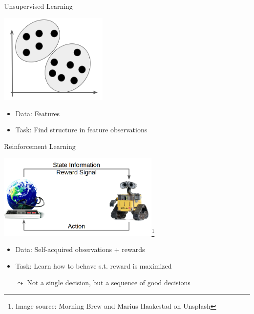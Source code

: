 \begin{frame}[c]{Unsupervised Learning}
	
	\centering
	\includegraphics[width=0.4\textwidth]{images/clustering.png}
	
	\bigskip
	
	\begin{itemize}
		\item Data: Features 
		\item Task: Find structure in feature observations
	\end{itemize}	
	
	
\end{frame}
\begin{frame}[c]{Reinforcement Learning}
	
		\centering
	\includegraphics[width=0.6\textwidth]{images/rl_comic.png}\footnote{Image source: Morning Brew and Marius Haakestad on Unsplash}
	
	\bigskip
	
	\begin{itemize}
		\item Data: Self-acquired observations + rewards
		\item Task: Learn how to behave s.t. reward is maximized
		\item[$\leadsto$] Not a single decision, but a sequence of good decisions
	\end{itemize}	
	
	
\end{frame}
